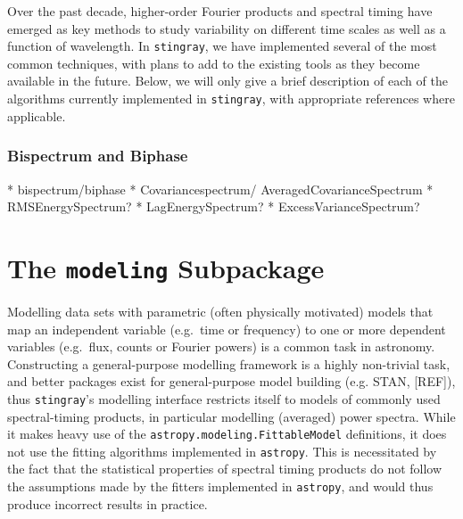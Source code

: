 \documentclass[12pt]{emulateapj}
\newcommand{\stingray}{\texttt{stingray}\xspace}
\begin{document}
Over the past decade, higher-order Fourier products and spectral timing have emerged as key methods to study variability on different time scales as well as a function of wavelength. In \stingray, we have implemented several of the most common techniques, with plans to add to the existing tools as they become available in the future. Below, we will only give a brief description of each of the algorithms currently implemented in \stingray, with appropriate references where applicable.


\subsubsection{Bispectrum and Biphase}
                


* bispectrum/biphase
* Covariancespectrum/ AveragedCovarianceSpectrum
* RMSEnergySpectrum?
* LagEnergySpectrum?
* ExcessVarianceSpectrum?
 

\section{The \texttt{modeling} Subpackage}
\label{sec:modeling}

Modelling data sets with parametric (often physically motivated) models that map an independent variable (e.g.\ time or frequency) to one or more dependent variables (e.g.\ flux, counts or Fourier powers) is a common task in astronomy. Constructing a general-purpose modelling framework is a highly non-trivial task, and better packages exist for general-purpose model building (e.g. STAN, [REF]), thus \stingray's modelling interface restricts itself to models of commonly used spectral-timing products, in particular modelling (averaged) power spectra. 
While it makes heavy use of the \verb|astropy.modeling.FittableModel| definitions, it does not use the fitting algorithms implemented in \texttt{astropy}. This is necessitated by the fact that the statistical properties of spectral timing products do not follow the assumptions made by the fitters implemented in \texttt{astropy}, and would thus produce incorrect results in practice.
\end{document}
